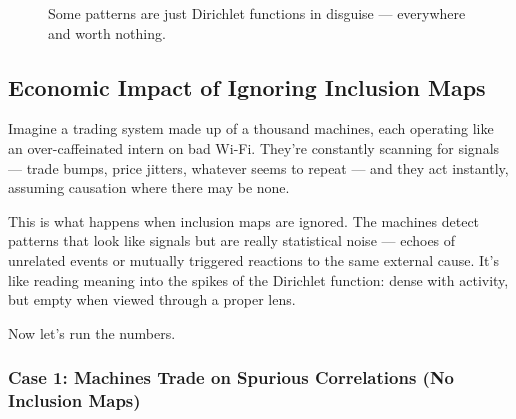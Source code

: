 \begin{figure}[H]
\centering
{}
\caption{Some patterns are just Dirichlet functions in disguise — everywhere and worth nothing.}
\end{figure}






\subsection{Economic Impact of Ignoring Inclusion Maps}

\vspace{0.5em}
\noindent
Imagine a trading system made up of a thousand machines, each operating like an over-caffeinated intern on bad Wi-Fi. They're constantly scanning for signals --- trade bumps, price jitters, whatever seems to repeat --- and they act instantly, assuming causation where there may be none.

This is what happens when inclusion maps are ignored. The machines detect patterns that look like signals but are really statistical noise --- echoes of unrelated events or mutually triggered reactions to the same external cause. It’s like reading meaning into the spikes of the Dirichlet function: dense with activity, but empty when viewed through a proper lens.

Now let’s run the numbers.

\subsubsection{Case 1: Machines Trade on Spurious Correlations (No Inclusion Maps)}


